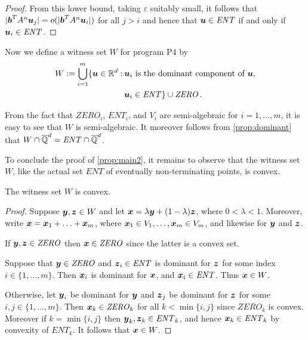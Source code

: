\begin{proof}
From this lower bound, taking $\varepsilon$ suitably small, it follows
that $|\boldsymbol{b}^TA^n\boldsymbol{u}_j|=o(|\boldsymbol{b}^TA^n
\boldsymbol{u}_i|)$ for all $j>i$ and hence that
$\boldsymbol{u}\in\mathit{ENT}$ if and only if $\boldsymbol{u}_i\in
\mathit{ENT}$.
\end{proof}

Now we define a witness set $W$ for program \textsf{P4} by
\begin{align*}
W :=   \bigcup_{i=1}^m \{\boldsymbol{u}\in \mathbb{R}^d: \,
         & \boldsymbol{u}_i \mbox{ is the dominant component of } \boldsymbol{u},\\
         & \boldsymbol{u}_i \in \mathit{ENT} \}
\cup \mathit{ZERO} \, .
\end{align*}

From the fact that $\mathit{ZERO}_i$, $\mathit{ENT}_i$, and $V_i$ are
semi-algebraic for $i=1,\ldots,m$, it is easy to see that $W$ is
semi-algebraic.  It moreover follows from \cref{prop:dominant}
that $W \cap \overline{\mathbb{Q}}^d = \mathit{ENT} \cap \overline{\mathbb{Q}}^d$.

To conclude the proof of \cref{prop:main2}, it
remains to observe that the witness set $W$, like the actual set
$\mathit{ENT}$ of eventually non-terminating points, is convex.
\begin{proposition}
The witness set $W$ is convex.
\end{proposition}
\begin{proof}
  Suppose $\boldsymbol y,\boldsymbol z\in W$ and let $\boldsymbol
  x=\lambda\boldsymbol y+(1-\lambda)\boldsymbol z$, where $0 < \lambda
  < 1$. Moreover, write
  $\boldsymbol{x}=\boldsymbol{x}_1+\ldots+\boldsymbol{x}_m$, where
  $\boldsymbol{x}_1\in V_1,\ldots,\boldsymbol{x}_m\in V_m$, and
  likewise for $\boldsymbol{y}$ and $\boldsymbol{z}$.

If $\boldsymbol{y},\boldsymbol{z}\in \mathit{ZERO}$ then
$\boldsymbol{x}\in \mathit{ZERO}$ since the latter is a convex set.

Suppose that $\boldsymbol{y}\in \mathit{ZERO}$ and $\boldsymbol{z}_i \in \mathit{ENT}$ is dominant for $\boldsymbol{z}$ for some index $i\in\{1,\ldots,m\}$.
Then $\boldsymbol{x}_i$ is dominant for $\boldsymbol{x}$, and
$\boldsymbol{x}_i \in \mathit{ENT}$.  Thus $\boldsymbol{x}\in W$.

Otherwise, let $\boldsymbol y_i$ be dominant for $\boldsymbol y$ and
$\boldsymbol z_j$ be dominant for $\boldsymbol z$ for some
$i,j\in\{1,\ldots,m\}$.  Then $\boldsymbol x_k\in \mathit{ZERO}_k$ for
all $k<\min\lbrace i,j\rbrace$ since $\mathit{ZERO}_k$ is convex.
Moreover if $k=\min\lbrace i,j\rbrace$ then $\boldsymbol
y_k,\boldsymbol z_k \in \mathit{ENT}_k$, and hence $\boldsymbol x_k
\in \mathit{ENT}_k$ by convexity of $\mathit{ENT}_k$.  It follows that
$\boldsymbol{x}\in W$.
\end{proof}

